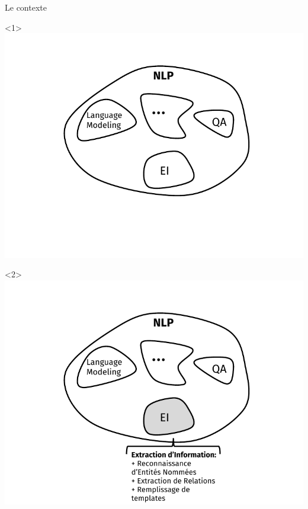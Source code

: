 \documentclass[10pt]{beamer}
\begin{document}
\begin{frame}{Le contexte}
	\begin{onlyenv}\vspace*{\fill}\includegraphics[width=1\linewidth]{"img/nlp_diag"}\vspace*{\fill}\end{onlyenv}		\begin{onlyenv}<2>\vspace*{\fill}\includegraphics[width=1\linewidth]{"img/nlp_diag2"}\vspace*{\fill}\end{onlyenv}

\end{frame}
\end{document}
